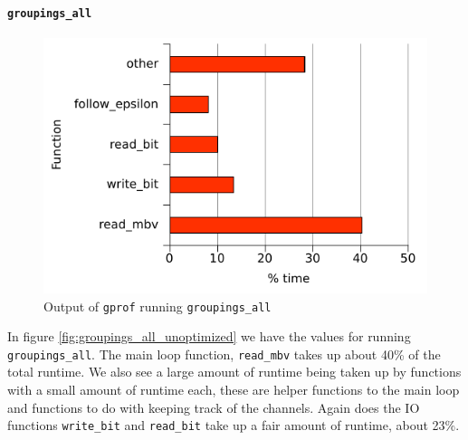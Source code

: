 \paragraph{\texttt{groupings\_all}}
\begin{figure}
  \centering
  \includegraphics[]{optimizations/groupings_all_unoptimized.pdf}
  \caption{Output of \texttt{gprof} running \texttt{groupings\_all}}
  \label{fig:groupings_all_unoptimized}
\end{figure}
In figure \vref{fig:groupings_all_unoptimized} we have the values for
running \texttt{groupings\_all}. The main loop function,
\lstinline{read_mbv} takes up about 40\% of the total runtime. We also
see a large amount of runtime being taken up by functions with a small
amount of runtime each, these are helper functions to the main loop
and functions to do with keeping track of the channels. Again does the
IO functions \lstinline{write_bit} and \lstinline{read_bit} take up a
fair amount of runtime, about 23\%.

